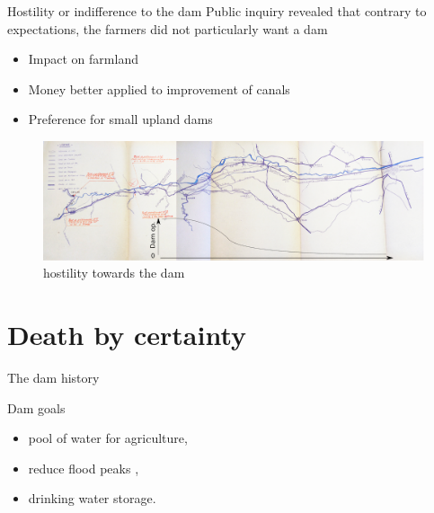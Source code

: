 \documentclass[newPxFont]{beamer}
\begin{document}
\begin{frame}[c]{Hostility or indifference to the dam}
\vspace{-2em}
Public inquiry revealed that contrary to expectations, the farmers did not particularly want a dam

\begin{itemize}
	\item Impact on farmland
	\item Money better applied to improvement of canals
	\item Preference for small upland dams
\end{itemize}
\begin{figure}
	\centering
	\includegraphics[width = \textwidth]{img/epiphenomene}
	 \caption{hostility towards the dam}
\end{figure}
\end{frame}


\section{Death by certainty}


\begin{frame}[c]{The dam history}
\vspace{-0.5cm}

\startchronology[startyear=1900, stopyear=2000]
\stopchronology

\vspace{-1em}
Dam goals
\begin{itemize}
	\item pool of water for agriculture,
	\item reduce flood peaks ,
	\item drinking water storage.
\end{itemize}

\end{frame}
\end{document}
